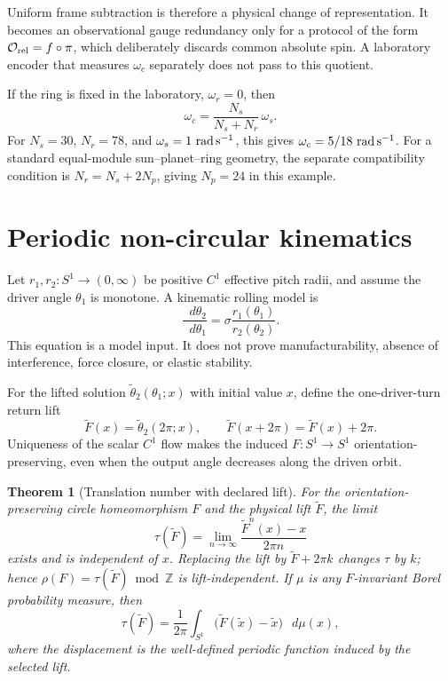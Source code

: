 \documentclass[11pt,a4paper]{article}
\theoremstyle{definition}
\theoremstyle{plain}
\newtheorem{theorem}[definition]{Theorem}
\theoremstyle{remark}
\newcommand{\Z}{\mathbb{Z}}
\newcommand{\dd}{\mathop{}\!d}
\newcommand{\Ocal}{\mathcal O}
\begin{document}
Uniform frame subtraction is therefore a physical change of
representation. It becomes an observational gauge redundancy only
for a protocol of the form
\(\Ocal_{\rm rel}=f\circ\pi\), which deliberately discards common
absolute spin. A laboratory encoder that measures \(\omega_c\)
separately does not pass to this quotient.

If the ring is fixed in the laboratory, \(\omega_r=0\), then
\[
\omega_c=\frac{N_s}{N_s+N_r}\,\omega_s.
\]
For \(N_s=30\), \(N_r=78\), and
\(\omega_s=1\ {\rm rad\,s^{-1}}\), this gives
\(\omega_c=5/18\ {\rm rad\,s^{-1}}\). For a standard equal-module
sun--planet--ring geometry, the separate compatibility condition is
\(N_r=N_s+2N_p\), giving \(N_p=24\) in this example.

\section{Periodic non-circular kinematics}

Let \(r_1,r_2:S^1\to(0,\infty)\) be positive \(C^1\) effective pitch
radii, and assume the driver angle \(\theta_1\) is monotone. A
kinematic rolling model is
\begin{equation}\label{eq:noncircular-ode}
\frac{\dd\theta_2}{\dd\theta_1}
=\sigma\frac{r_1(\theta_1)}{r_2(\theta_2)}.
\end{equation}
This equation is a model input. It does not prove manufacturability,
absence of interference, force closure, or elastic stability.

For the lifted solution
\(\widetilde\theta_2(\theta_1;x)\) with initial value \(x\), define
the one-driver-turn return lift
\begin{equation}\label{eq:return-lift}
\widetilde F(x)
=\widetilde\theta_2(2\pi;x),\qquad
\widetilde F(x+2\pi)=\widetilde F(x)+2\pi.
\end{equation}
Uniqueness of the scalar \(C^1\) flow makes the induced
\(F:S^1\to S^1\) orientation-preserving, even when the output angle
decreases along the driven orbit.

\begin{theorem}[Translation number with declared lift]
\label{thm:translation-number}
For the orientation-preserving circle homeomorphism \(F\) and the
physical lift \(\widetilde F\), the limit
\begin{equation}\label{eq:translation-number}
\tau(\widetilde F)
=\lim_{n\to\infty}
\frac{\widetilde F^n(x)-x}{2\pi n}
\end{equation}
exists and is independent of \(x\). Replacing the lift by
\(\widetilde F+2\pi k\) changes \(\tau\) by \(k\); hence
\(\rho(F)=\tau(\widetilde F)\bmod\Z\) is lift-independent.
If \(\mu\) is any \(F\)-invariant Borel probability measure, then
\[
\tau(\widetilde F)
=\frac1{2\pi}\int_{S^1}
\bigl(\widetilde F(\widetilde x)-\widetilde x\bigr)\,\dd\mu(x),
\]
where the displacement is the well-defined periodic function induced
by the selected lift.
\end{theorem}
\end{document}
